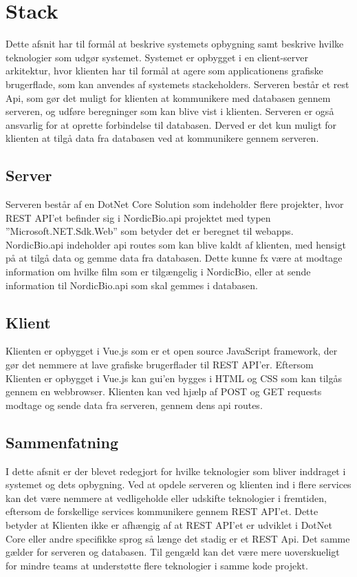 \section{Stack}
Dette afsnit har til formål at beskrive systemets opbygning samt beskrive hvilke teknologier som udgør systemet. 
Systemet er opbygget i en client-server arkitektur, hvor klienten har til formål at agere som applicationens grafiske 
brugerflade, som kan anvendes af systemets stackeholders. Serveren består et rest Api, som gør det muligt for klienten 
at kommunikere med databasen gennem serveren, og udføre beregninger som kan blive vist i klienten. Serveren er også 
ansvarlig for at oprette forbindelse til databasen. Derved er det kun muligt for klienten at tilgå data fra databasen 
ved at kommunikere gennem serveren.\\

\subsection{Server}
Serveren består af en DotNet Core Solution som indeholder flere projekter, hvor REST API’et befinder sig i NordicBio.api 
projektet med typen ”Microsoft.NET.Sdk.Web” som betyder det er beregnet til webapps. 
NordicBio.api indeholder api routes som kan blive kaldt af klienten, med hensigt på at tilgå data og gemme data fra databasen. 
Dette kunne fx være at modtage information om hvilke film som er tilgængelig i NordicBio, eller at sende information til 
NordicBio.api som skal gemmes i databasen.\\

\subsection{Klient}
Klienten er opbygget i Vue.js som er et open source JavaScript framework, der gør det nemmere at lave grafiske 
brugerflader til REST API’er. Eftersom Klienten er opbygget i Vue.js kan gui’en bygges i HTML og CSS som kan tilgås 
gennem en webbrowser. Klienten kan ved hjælp af POST og GET requests modtage og sende data fra serveren, 
gennem dens api routes.\\

\subsection{Sammenfatning}
I dette afsnit er der blevet redegjort for hvilke teknologier som bliver inddraget i systemet og dets opbygning. 
Ved at opdele serveren og klienten ind i flere services kan det være nemmere at vedligeholde eller udskifte teknologier 
i fremtiden, eftersom de forskellige services kommunikere gennem REST API’et. 
Dette betyder at Klienten ikke er afhængig af at REST API’et er udviklet i DotNet Core eller andre specifikke sprog så 
længe det stadig er et REST Api. Det samme gælder for serveren og databasen. Til gengæld kan det være mere uoverskueligt 
for mindre teams at understøtte flere teknologier i samme kode projekt. 


